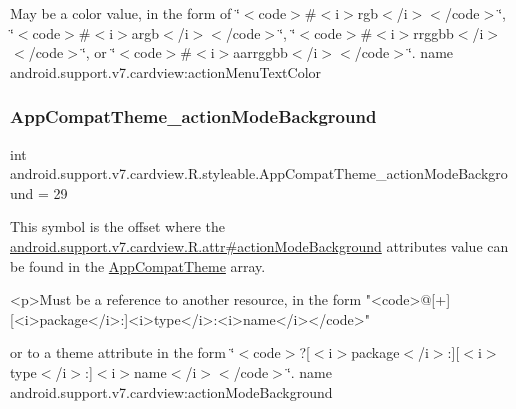 May be a color value, in the form of \char`\"{}$<$code$>$\#$<$i$>$rgb$<$/i$>$$<$/code$>$\char`\"{}, \char`\"{}$<$code$>$\#$<$i$>$argb$<$/i$>$$<$/code$>$\char`\"{}, \char`\"{}$<$code$>$\#$<$i$>$rrggbb$<$/i$>$$<$/code$>$\char`\"{}, or \char`\"{}$<$code$>$\#$<$i$>$aarrggbb$<$/i$>$$<$/code$>$\char`\"{}.  name android.\+support.\+v7.\+cardview\+:action\+Menu\+Text\+Color \mbox{\label{classandroid_1_1support_1_1v7_1_1cardview_1_1R_1_1styleable_a3daccfb428ba25d01af0a76d23f50715}} 
\subsubsection{\texorpdfstring{App\+Compat\+Theme\+\_\+action\+Mode\+Background}{AppCompatTheme\_actionModeBackground}}
{\footnotesize\ttfamily int android.\+support.\+v7.\+cardview.\+R.\+styleable.\+App\+Compat\+Theme\+\_\+action\+Mode\+Background = 29\hspace{0.3cm}{\ttfamily [static]}}

This symbol is the offset where the \hyperlink{classandroid_1_1support_1_1v7_1_1cardview_1_1R_1_1attr_a79984b1b7a19fe268b558f520a308f19}{android.\+support.\+v7.\+cardview.\+R.\+attr\#action\+Mode\+Background} attribute\textquotesingle{}s value can be found in the \hyperlink{classandroid_1_1support_1_1v7_1_1cardview_1_1R_1_1styleable_a52e6f69f954ecc2622d72c0b4d298938}{App\+Compat\+Theme} array.

\begin{DoxyVerb}      <p>Must be a reference to another resource, in the form "<code>@[+][<i>package</i>:]<i>type</i>:<i>name</i></code>"
\end{DoxyVerb}
 or to a theme attribute in the form \char`\"{}$<$code$>$?\mbox{[}$<$i$>$package$<$/i$>$\+:\mbox{]}\mbox{[}$<$i$>$type$<$/i$>$\+:\mbox{]}$<$i$>$name$<$/i$>$$<$/code$>$\char`\"{}.  name android.\+support.\+v7.\+cardview\+:action\+Mode\+Background \mbox{\label{classandroid_1_1support_1_1v7_1_1cardview_1_1R_1_1styleable_a2a8f512e4939be1532337d4efd1ab3cd}} 
